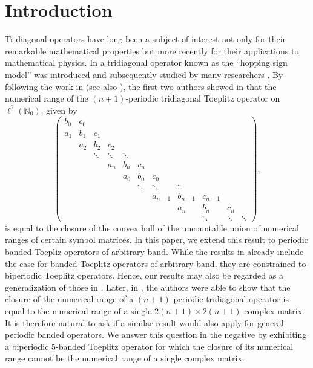 \documentclass[12pt,reqno]{amsart}
\theoremstyle{definition}
\newcommand{\N}{{\mathbb{N}}}
\begin{document}
\section{Introduction}
Tridiagonal operators have long been a subject of interest not only for their remarkable mathematical properties   but more recently for their applications to mathematical physics. In \cite{F99} a tridiagonal operator known as the ``hopping sign model'' was introduced and subsequently studied by many researchers 
\cite{ChN2011,Ch-W2011,Hagger2015,ChS,IO-MA-N2022}.
By following the work in \cite{Bebianoetal} (see also \cite{BS}), the first two authors showed in \cite{IM} that the numerical range of the $(n+1)$-periodic tridiagonal Toeplitz operator on $\ell^2(\N_0)$,  given by
\[
\begin{pmatrix}
b_0 & c_0 & & & & & & & &\\
a_1 & b_1 & c_1 & & & & & & & \\
    & a_{2} & b_2 & c_2 & & & & & & \\
    &       & \ddots & \ddots  & \ddots & & & & & \\
    & & & a_{n} & b_n & c_n & & & &\\
    & & & & a_{0} & b_0 & c_0 & & &\\
    & & & & & \ddots & \ddots & \ddots & &\\
    & & & & & &a_{n-1} & b_{n-1}& c_{n-1} & \\
    & & & & & & &  a_n& b_n  & c_n &\\
    & & & & & & & & \ddots &  \ddots&\ddots
\end{pmatrix},
\]
is equal to the closure of the convex hull of the uncountable union of numerical ranges of certain symbol matrices. In this paper, we extend this result to periodic banded Toepliz operators of arbitrary band. While the results in \cite{Bebianoetal} already include the case for banded Toeplitz operators of arbitrary band, they are constrained to biperiodic Toeplitz operators. Hence, our results may also be regarded as a generalization of those in \cite{Bebianoetal}. Later, in \cite{IO-MA-N2022}, the authors were able to show that the closure of the numerical range of a $(n+1)$-periodic tridiagonal operator is equal to the numerical range of a single $2(n+1)\times2(n+1)$ complex matrix. It is therefore natural to ask if a similar result would also apply for general periodic banded operators. We answer this question in the negative by exhibiting a biperiodic $5$-banded Toeplitz operator for which the closure of its numerical range cannot be the numerical range of a single complex matrix.
\end{document}
